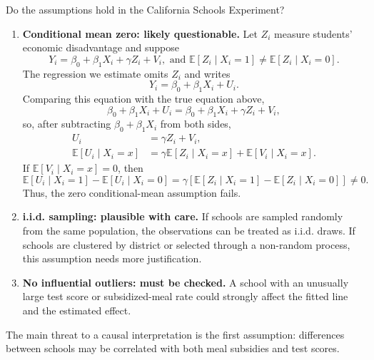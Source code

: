 \documentclass[notes,10pt, aspectratio=169]{beamer}
\begin{document}
\begin{frame}{Do the assumptions hold in the California Schools Experiment?}
\footnotesize
\begin{enumerate}
    \item \textbf{Conditional mean zero: likely questionable.} Let $Z_i$ measure students' economic disadvantage and suppose
    \[
        Y_i=\beta_0+\beta_1X_i+\gamma Z_i+V_i,
        \text{ and }\mathbb{E}[Z_i\mid X_i=1]\neq\mathbb{E}[Z_i\mid X_i=0].
    \]
    The regression we estimate omits $Z_i$ and writes
    \[
        Y_i=\beta_0+\beta_1X_i+U_i.
    \]
    Comparing this equation with the true equation above,
    \[
        \beta_0+\beta_1X_i+U_i
        =\beta_0+\beta_1X_i+\gamma Z_i+V_i,
    \]
    so, after subtracting $\beta_0+\beta_1X_i$ from both sides,
    \begin{align*}
        U_i&=\gamma Z_i+V_i,\\
        \mathbb{E}[U_i\mid X_i=x]
        &=\gamma\mathbb{E}[Z_i\mid X_i=x]+\mathbb{E}[V_i\mid X_i=x].
    \end{align*}
    If $\mathbb{E}[V_i\mid X_i=x]=0$, then
    \[
    \mathbb{E}[U_i\mid X_i=1]-\mathbb{E}[U_i\mid X_i=0]
    =\gamma\left[\mathbb{E}[Z_i\mid X_i=1]-\mathbb{E}[Z_i\mid X_i=0]\right]\neq 0.
    \]
    Thus, the zero conditional-mean assumption fails.
    \item \textbf{i.i.d. sampling: plausible with care.} If schools are sampled randomly from the same population, the observations can be treated as i.i.d. draws. If schools are clustered by district or selected through a non-random process, this assumption needs more justification.
    \item \textbf{No influential outliers: must be checked.} A school with an unusually large test score or subsidized-meal rate could strongly affect the fitted line and the estimated effect.
\end{enumerate}
The main threat to a causal interpretation is the first assumption: differences between schools may be correlated with both meal subsidies and test scores.
\end{frame}
\end{document}
